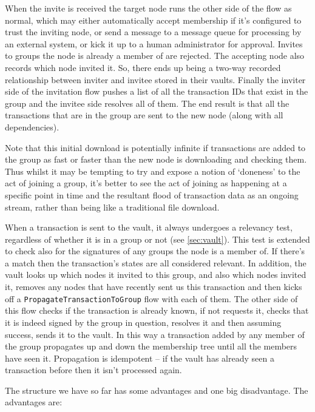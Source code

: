 \documentclass{article}
\begin{document}
When the invite is received the target node runs the other side of the flow as normal, which may either automatically
accept membership if it's configured to trust the inviting node, or send a message to a message queue for processing by an
external system, or kick it up to a human administrator for approval. Invites to groups the node is already a
member of are rejected. The accepting node also records which node invited it. So, there ends up being a two-way
recorded relationship between inviter and invitee stored in their vaults. Finally the inviter side of the
invitation flow pushes a list of all the transaction IDs that exist in the group and the invitee side resolves all of
them. The end result is that all the transactions that are in the group are sent to the new node (along with all
dependencies).

Note that this initial download is potentially infinite if transactions are added to the group as fast or faster than the
new node is downloading and checking them. Thus whilst it may be tempting to try and expose a notion of `doneness' to
the act of joining a group, it's better to see the act of joining as happening at a specific point in time and the
resultant flood of transaction data as an ongoing stream, rather than being like a traditional file download.

When a transaction is sent to the vault, it always undergoes a relevancy test, regardless of whether it is in a group
or not (see \cref{sec:vault}). This test is extended to check also for the
signatures of any groups the node is a member of. If there's a match then the transaction's states are all considered
relevant. In addition, the vault looks up which nodes it invited to this group, and also which nodes invited it, removes
any nodes that have recently sent us this transaction and then kicks off a \texttt{PropagateTransactionToGroup} flow
with each of them.  The other side of this flow checks if the transaction is already known, if not requests it, checks
that it is indeed signed by the group in question, resolves it and then assuming success, sends it to the vault. In this
way a transaction added by any member of the group propagates up and down the membership tree until all the members have
seen it. Propagation is idempotent -- if the vault has already seen a transaction before then it isn't processed again.

The structure we have so far has some advantages and one big disadvantage. The advantages are:
\end{document}
